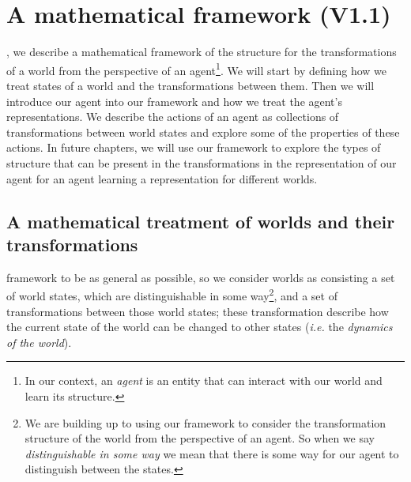 \chapter{
A mathematical framework
(V1.1)
}



, we describe a mathematical framework of the structure for the transformations of a world from the perspective of an agent\footnote{In our context, an \emph{agent} is an entity that can interact with our world and learn its structure.}.
We will start by defining how we treat states of a world and the transformations between them.
Then we will introduce our agent into our framework and how we treat the agent's representations.
We describe the actions of an agent as collections of transformations between world states and explore some of the properties of these actions.
In future chapters, we will use our framework to explore the types of structure that can be present in the transformations in the representation of our agent for an agent learning a representation for different worlds.

\section{A mathematical treatment of worlds and their transformations}\label{sec:A mathematical treatment of worlds and their transformations}

 framework to be as general as possible, so we consider worlds as consisting a set of world states, which are distinguishable in some way\footnote{We are building up to using our framework to consider the transformation structure of the world from the perspective of an agent. So when we say \emph{distinguishable in some way} we mean that there is some way for our agent to distinguish between the states.}, and a set of transformations between those world states; these transformation describe how the current state of the world can be changed to other states (\textit{i.e.} the \emph{dynamics of the world}).

